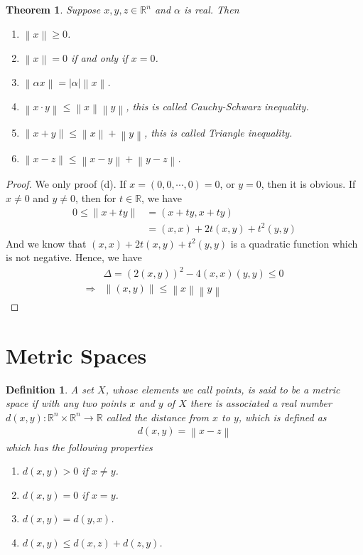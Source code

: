 \documentclass[12pt,leqno]{amsart}
\newtheorem{definition}{Definition}[section]
\newtheorem{theorem}{Theorem}[section]
\theoremstyle{definition}
\numberwithin{equation}{subsection}
\begin{document}
\begin{theorem}
Suppose $x,y,z\in\mathbb{R}^n$ and $\alpha$ is real. Then 
\begin{enumerate}
    \item $\left\|x\right\|\geq 0$.
    \item $\left\|x\right\| = 0$ if and only if $x = 0$.
    \item $\left\|\alpha x\right\| = |\alpha|\left\|x\right\|$.
    \item $\left\|x\cdot y\right\| \leq \left\|x\right\|  \left\|y\right\|$, this is called Cauchy-Schwarz inequality.
    \item $\left\|x + y\right\| \leq \left\|x\right\| + \left\|y\right\|$, this is called Triangle inequality.
    \item $\left\|x - z\right\| \leq \left\|x - y\right\| + \left\|y - z\right\|$.
\end{enumerate}
\end{theorem}
\begin{proof}
We only proof (d). If $x = (0,0,\cdots,0) = 0$, or $y = 0$, then it is obvious. If $x \neq 0$ and $y\neq 0$, then for $t\in\mathbb{R}$, we have 
\begin{align*}
    0 \leq \left\|x+ty\right\| & = (x+ty, x+ty) \\
    & = (x,x) + 2t (x,y) + t^2(y,y)
\end{align*}
And we know that $(x,x) + 2t (x,y) + t^2(y,y)$ is a quadratic function which is not negative. Hence, we have 
\begin{align*}
    & \Delta = \left(2(x,y)\right)^2 - 4 (x,x)(y,y) \leq 0 \\
    \Rightarrow & \left\|(x,y)\right\| \leq \left\|x\right\|  \left\|y\right\|
\end{align*}
\end{proof}

\section{Metric Spaces}
\begin{definition}
A set $X$, whose elements we call points, is said to be a metric space if with any two points $x$ and $y$ of $X$ there is associated a real number $d(x,y): \mathbb{R}^n \times \mathbb{R}^n \rightarrow \mathbb{R}$ called the distance from $x$ to $y$, which is defined as 
\begin{align*}
    d(x,y) = \left\|x - z\right\|
\end{align*}
which has the following properties
\begin{enumerate}
    \item $d(x,y) > 0$ if $x\neq y$.
    \item $d(x,y) = 0$ if $x = y$.
    \item $d(x,y) = d(y,x)$.
    \item $d(x,y) \leq d(x,z) + d(z,y)$.
\end{enumerate}
\end{definition}
\end{document}
